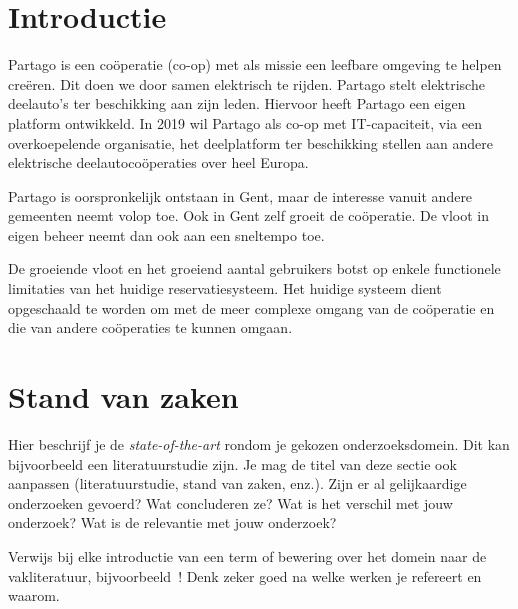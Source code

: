 
\section{Introductie} %
\label{sec:introductie}
Partago is een coöperatie (co-op) met als missie een leefbare omgeving te helpen creëren. Dit doen we door samen elektrisch te rijden. Partago stelt elektrische deelauto's ter beschikking aan zijn leden. Hiervoor heeft Partago een eigen platform ontwikkeld. In 2019 wil Partago als co-op met IT-capaciteit, via een overkoepelende organisatie, het deelplatform ter beschikking stellen aan andere elektrische deelautocoöperaties over heel Europa.

Partago is oorspronkelijk ontstaan in Gent, maar de interesse vanuit andere gemeenten neemt volop toe. Ook in Gent zelf groeit de coöperatie. De vloot in eigen beheer neemt dan ook aan een sneltempo toe. 

De groeiende vloot en het groeiend aantal gebruikers botst op enkele functionele limitaties van het huidige reservatiesysteem. Het huidige systeem dient opgeschaald te worden om met de meer complexe omgang van de coöperatie en die van andere coöperaties te kunnen omgaan. 


\section{Stand van zaken}
\label{sec:stand-van-zaken}

Hier beschrijf je de \emph{state-of-the-art} rondom je gekozen onderzoeksdomein. Dit kan bijvoorbeeld een literatuurstudie zijn. Je mag de titel van deze sectie ook aanpassen (literatuurstudie, stand van zaken, enz.). Zijn er al gelijkaardige onderzoeken gevoerd? Wat concluderen ze? Wat is het verschil met jouw onderzoek? Wat is de relevantie met jouw onderzoek?

Verwijs bij elke introductie van een term of bewering over het domein naar de vakliteratuur, bijvoorbeeld~\autocite{Doll1954}! Denk zeker goed na welke werken je refereert en waarom.



